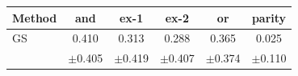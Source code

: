 \setlength{\tabcolsep}{5pt}
\begin{tabular}{lccccc}
\toprule
Method & and & ex-1 & ex-2 & or & parity \\
\midrule


GS
& 0.410 & 0.313 & 0.288 & 0.365 & 0.025 \\
& {\scriptsize $\pm$0.405} & {\scriptsize $\pm$0.419} & {\scriptsize $\pm$0.407} & {\scriptsize $\pm$0.374} & {\scriptsize $\pm$0.110} \\








\end{tabular}
